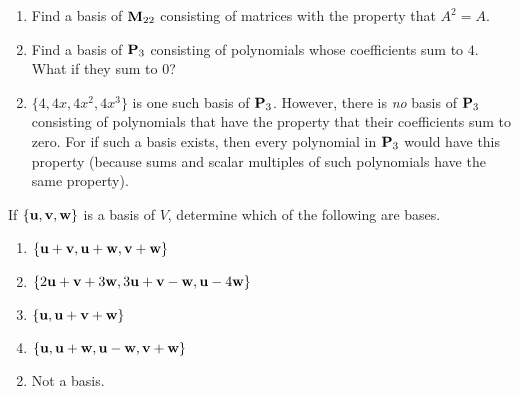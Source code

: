 \begin{multicols}{2}
\begin{ex}
\begin{sol}
\begin{enumerate}[label={\alph*.}]
\end{enumerate}
\end{sol}
\end{ex}

\begin{ex}
\begin{enumerate}[label={\alph*.}]
\item Find a basis of $\textbf{M}_{22}$ consisting of matrices with the property that $A^{2} = A$.

\item Find a basis of $\textbf{P}_{3}$ consisting of polynomials whose coefficients sum to $4$. What if they sum to $0$?

\end{enumerate}
\begin{sol}
\begin{enumerate}[label={\alph*.}]
\setcounter{enumi}{1}
\item  $\{4, 4x, 4x^{2}, 4x^{3}\}$ is one such basis of $\textbf{P}_{3}$. However, there is \textit{no} basis of $\textbf{P}_{3}$ consisting of polynomials that have the property that their coefficients sum to zero. For if such a basis exists, then every polynomial in $\textbf{P}_{3}$ would have this property (because sums and scalar multiples of such polynomials have the same property).

\end{enumerate}
\end{sol}
\end{ex}

\begin{ex}
If $\{\textbf{u}, \textbf{v}, \textbf{w}\}$ is a basis of $V$, determine which of the following are bases.

\begin{enumerate}[label={\alph*.}]
\item $\{\textbf{u} + \textbf{v}, \textbf{u} + \textbf{w}, \textbf{v} + \textbf{w}\}$

\item $\{2\textbf{u} + \textbf{v} + 3\textbf{w}, 3\textbf{u} + \textbf{v} - \textbf{w}, \textbf{u} - 4\textbf{w}\}$

\item $\{\textbf{u}, \textbf{u} + \textbf{v} + \textbf{w}\}$

\item $\{\textbf{u}, \textbf{u} + \textbf{w}, \textbf{u} - \textbf{w}, \textbf{v} + \textbf{w}\}$

\end{enumerate}
\begin{sol}
\begin{enumerate}[label={\alph*.}]
\setcounter{enumi}{1}
\item  Not a basis.


\end{enumerate}
\end{sol}
\end{ex}
\end{multicols}
